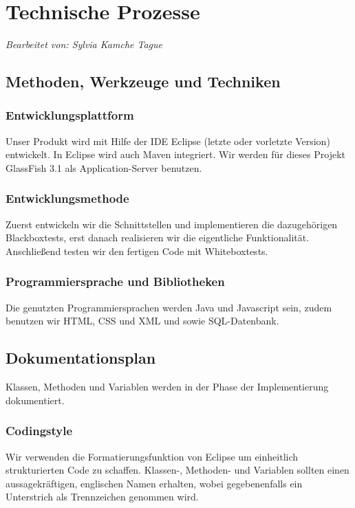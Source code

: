 \section{Technische Prozesse}
\textit{Bearbeitet von: Sylvia Kamche Tague}\\
\subsection{Methoden, Werkzeuge und Techniken}
\subsubsection{Entwicklungsplattform}
Unser Produkt wird mit Hilfe der IDE Eclipse (letzte oder vorletzte Version) entwickelt. In Eclipse wird auch Maven integriert. Wir werden für dieses Projekt GlassFish 3.1 als Application-Server benutzen.  

\subsubsection{Entwicklungsmethode}

Zuerst entwickeln wir die Schnittstellen und implementieren die dazugehörigen Blackboxtests, erst danach realisieren wir die eigentliche Funktionalität. Anschließend testen wir den fertigen Code mit Whiteboxtests.

\subsubsection{Programmiersprache und Bibliotheken}
Die genutzten Programmiersprachen werden Java und Javascript sein, zudem benutzen wir HTML, CSS und XML und sowie SQL-Datenbank.

\subsection{Dokumentationsplan}
Klassen, Methoden und Variablen werden in der Phase der Implementierung dokumentiert.

\subsubsection{Codingstyle}
Wir verwenden die Formatierungsfunktion von Eclipse um einheitlich strukturierten Code zu schaffen.
Klassen-, Methoden- und Variablen sollten einen aussagekräftigen, englischen Namen erhalten, wobei gegebenenfalls ein Unterstrich als Trennzeichen genommen wird.


